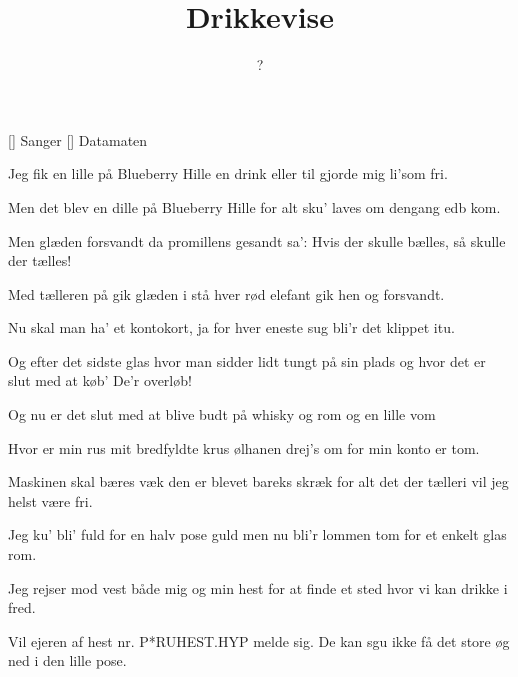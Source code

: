 \documentclass[a4paper,11pt]{article}
\title{Drikkevise}
\author{?}
\begin{document}
\maketitle

\begin{roles}
[] Sanger
[] Datamaten
\end{roles}

\begin{song}
Jeg fik en lille
på Blueberry Hille
en drink eller til
gjorde mig li'som fri.

Men det blev en dille
på Blueberry Hille
for alt sku' laves om
dengang edb kom.

Men glæden forsvandt da
promillens gesandt sa':
Hvis der skulle bælles,
så skulle der tælles!

Med tælleren på
gik glæden i stå
hver rød elefant
gik hen og forsvandt.

Nu skal man ha'
et kontokort, ja
for hver eneste sug
bli'r det klippet itu.

Og efter det sidste glas
hvor man sidder lidt tungt på sin plads
og hvor det er slut med at køb'
De'r overløb!

Og nu er det slut
med at blive budt
på whisky og rom
og en lille vom

Hvor er min rus
mit bredfyldte krus
ølhanen drej's om
for min konto er tom.

Maskinen skal bæres væk
den er blevet bareks skræk
for alt det der tælleri
vil jeg helst være fri.

Jeg ku' bli' fuld
for en halv pose guld
men nu bli'r lommen tom
for et enkelt glas rom.

Jeg rejser mod vest
både mig og min hest
for at finde et sted
hvor vi kan drikke i fred.
\end{song}

\begin{sketch}
   Vil ejeren af hest nr. P*RUHEST.HYP melde sig.  De kan sgu
  ikke få det store øg ned i den lille pose.
\end{sketch}
\end{document}
